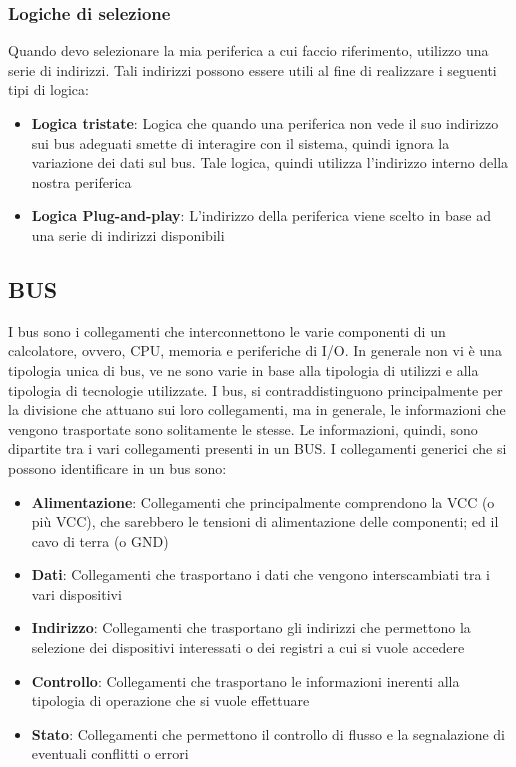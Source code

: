 \subsubsection{Logiche di selezione}
Quando devo selezionare la mia periferica a cui faccio riferimento, utilizzo una serie di indirizzi. Tali indirizzi possono essere utili al fine di realizzare i seguenti tipi di logica:
\begin{itemize}
    \item \textbf{Logica tristate}: Logica che quando una periferica non vede il suo indirizzo sui bus adeguati smette di interagire con il sistema, quindi ignora la variazione dei dati sul bus. Tale logica, quindi utilizza l'indirizzo interno della nostra periferica
    \item \textbf{Logica Plug-and-play}: L'indirizzo della periferica viene scelto in base ad una serie di indirizzi disponibili
\end{itemize}

\subsection{BUS}
I bus sono i collegamenti che interconnettono le varie componenti di un calcolatore, ovvero, CPU, memoria e periferiche di I/O.
In generale non vi è una tipologia unica di bus, ve ne sono varie in base alla tipologia di utilizzi e alla tipologia di tecnologie utilizzate.
I bus, si contraddistinguono principalmente per la divisione che attuano sui loro collegamenti, ma in generale, le informazioni che vengono trasportate sono solitamente le stesse.
Le informazioni, quindi, sono dipartite tra i vari collegamenti presenti in un BUS. I collegamenti generici che si possono identificare in un bus sono:
\begin{itemize}
    \item \textbf{Alimentazione}: Collegamenti che principalmente comprendono la VCC (o più VCC), che sarebbero le tensioni di alimentazione delle componenti; ed il cavo di terra (o GND)
    \item \textbf{Dati}: Collegamenti che trasportano i dati che vengono interscambiati tra i vari dispositivi
    \item \textbf{Indirizzo}: Collegamenti che trasportano gli indirizzi che permettono la selezione dei dispositivi interessati o dei registri a cui si vuole accedere
    \item \textbf{Controllo}: Collegamenti che trasportano le informazioni inerenti alla tipologia di operazione che si vuole effettuare
    \item \textbf{Stato}: Collegamenti che permettono il controllo di flusso e la segnalazione di eventuali conflitti o errori
\end{itemize}

